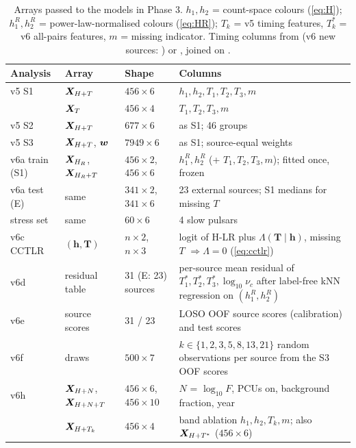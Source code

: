 \begin{table}[htbp]
\centering\small
\caption[Phase 3 arrays]{Arrays passed to the models in Phase 3. $h_1,h_2$ = count-space colours (\cref{eq:H}); $h^R_1,h^R_2$ =
power-law-normalised colours (\cref{eq:HR}); $T_k$ = v5 timing features, $T^*_k$ = v6 all-pairs features, $m$ = missing
indicator. Timing columns from  (v6 new sources:
) or , joined on .}
\label{tab:p3arrays}
\begin{tabularx}{\textwidth}{@{}p{2.2cm}p{2.0cm}p{2.0cm}X@{}}
\toprule
Analysis & Array & Shape & Columns \\
\midrule
v5 S1 & $\bm{X}_{H+T}$ & $456\times6$ & $h_1,h_2,T_1,T_2,T_3,m$ \\
 & $\bm{X}_T$ & $456\times4$ & $T_1,T_2,T_3,m$ \\
v5 S2 & $\bm{X}_{H+T}$ & $677\times6$ & as S1; 46 groups \\
v5 S3 & $\bm{X}_{H+T}$, $\bm{w}$ & $7949\times6$ & as S1; source-equal weights \\
v6a train (S1) & $\bm{X}_{H_R}$, $\bm{X}_{H_R+T}$ & $456\times2$, $456\times6$ & $h^R_1,h^R_2$ (+ $T_1,T_2,T_3,m$); fitted once, frozen \\
v6a test (E) & same & $341\times2$, $341\times6$ & 23 external sources; S1 medians for missing $T$ \\
stress set & same & $60\times6$ & 4 slow pulsars \\
v6c CCTLR & $(\bm h,\bm T)$ & $n\times2$, $n\times3$ & logit of H-LR plus $\Lambda(\bm T\mid\bm h)$, missing $T$ $\Rightarrow\Lambda=0$ (\cref{eq:cctlr}) \\
v6d & residual table & 31 (E: 23) sources & per-source mean residual of $T^*_1,T^*_2,T^*_3,\log_{10}\nu_c$ after label-free kNN regression on $(h^R_1,h^R_2)$ \\
v6e & source scores & 31 / 23 & LOSO OOF source scores (calibration) and test scores \\
v6f & draws & $500\times7$ & $k\in\{1,2,3,5,8,13,21\}$ random observations per source from the S3 OOF scores \\
v6h & $\bm{X}_{H+N}$, $\bm{X}_{H+N+T}$ & $456\times6$, $456\times10$ & $N$ = $\log_{10}F$, PCUs on, background fraction, year \\
 & $\bm{X}_{H+T_k}$ & $456\times4$ & band ablation $h_1,h_2,T_k,m$; also $\bm{X}_{H+T^*}$ ($456\times6$) \\
\bottomrule
\end{tabularx}
\end{table}

